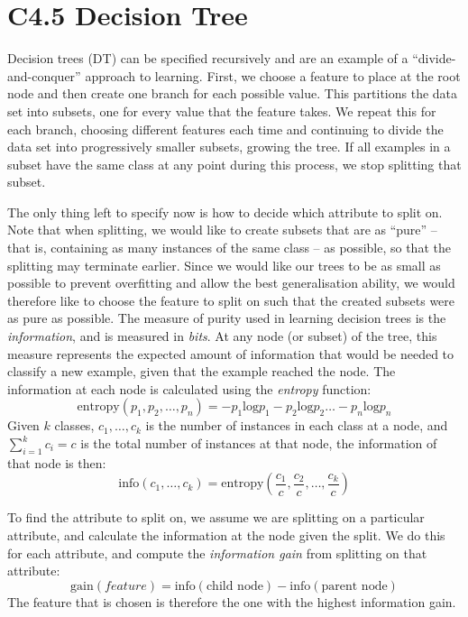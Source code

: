 \section{C4.5 Decision Tree}
\label{sec:c45}
Decision trees (DT) can be specified recursively and are an example of a
``divide-and-conquer'' approach to learning. First, we choose a feature to
place at the root node and then create one branch for each possible value.
This partitions the data set into subsets, one for every value that the
feature takes. We repeat this for each branch, choosing different features
each time and continuing to divide the data set into progressively smaller
subsets, growing the tree.
If all examples in a subset have the same class at any point during
this process, we stop splitting that subset.

The only thing left to specify
now is how to decide which attribute to split on. Note that when splitting,
we would like to create subsets that are as ``pure''
-- that is, containing as many
instances of the same class -- as possible, so that the splitting may
terminate earlier. Since we would like our trees to be as small as possible to
prevent overfitting and allow the best generalisation ability,
we would therefore like to choose the feature to split on such that the
created subsets were as pure as possible. The measure of purity used in
learning decision trees is the \textit{information}, and is measured in
\textit{bits}. At any node (or subset) of the tree, this measure represents
the expected amount of information that would be needed to classify a new
example, given that the example reached the node. The information at each
node is calculated using the \textit{entropy} function:
\begin{equation}
\label{eqn:entropy}
\mathrm{entropy}(p_1,p_2,\ldots,p_n) = -p_1\mathrm{log}p_1 -p_2\mathrm{log}p_2 \ldots -p_n\mathrm{log}p_n
\end{equation}
Given $k$ classes, $c_1,\ldots,c_k$ is the number of instances in each
class at a node, and $\sum_{i=1}^k c_i = c$ is the total number of instances
at that node, the information of that node is then:
\begin{equation*}
\mathrm{info}(c_1,\ldots,c_k) = \mathrm{entropy}\left(\frac{c_1}{c},\frac{c_2}{c},\ldots,\frac{c_k}{c}\right)
\end{equation*}

To find the attribute to split on, we assume we are splitting on a particular
attribute, and calculate the information at the node given the split. We do
this for each attribute, and compute the \textit{information gain} from
splitting on that attribute:
\begin{equation*}
\mathrm{gain}(feature) = \mathrm{info}(\text{child node}) - \mathrm{info}(\text{parent node})
\end{equation*}
The feature that is chosen is therefore the one with the highest information
gain.

